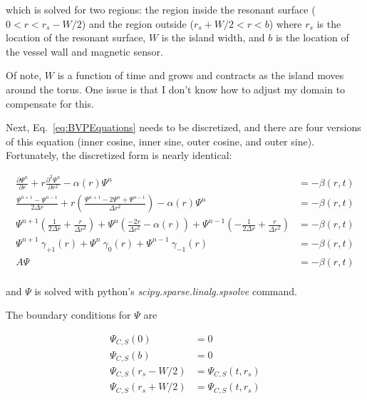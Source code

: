 \documentclass{article}
\begin{document}
\noindent which is solved for two regions: the region inside the resonant surface ($0<r<r_s-W/2$) and the region outside ($r_s+W/2<r<b$) where $r_s$ is the location of the resonant surface, $W$ is the island width, and $b$ is the location of the vessel wall and magnetic sensor.  

Of note, $W$ is a function of time and grows and contracts as the island moves around the torus.  One issue is that I don't know how to adjust my domain to compensate for this.  

Next, Eq.~\ref{eq:BVPEquations} needs to be discretized, and there are four versions of this equation (inner cosine, inner sine, outer cosine, and outer sine).  Fortunately, the discretized form is nearly identical:


\begin{equation} \label{eq:BVPSolved}
\begin{split}
 \frac{\partial \Psi^n}{\partial r} + r \frac{\partial^2 \Psi^n}{\partial r^2} -\alpha(r)  \Psi^n  & = - \beta(r,t) \\ 
 \frac{\Psi^{n+1}-\Psi^{n-1}}{2\Delta r}+r\left(\frac{\Psi^{n+1}-2\Psi^{n}+\Psi^{n-1}}{\Delta r^2}\right)-\alpha(r)\Psi^n & = - \beta(r,t)  \\
  \Psi^{n+1}\left(\frac{1}{2 \Delta r}+\frac{r}{\Delta r^2 }\right) + \Psi^n\left( \frac{-2r}{\Delta r^2} -\alpha(r) \right) + \Psi^{n-1}\left(-\frac{1}{2\Delta r} + \frac{r}{\Delta r^2} \right) & = - \beta(r,t) \\
  \Psi^{n+1} \ \gamma_{+1}(r) + \Psi^n \ \gamma_{0}(r) + \Psi^{n-1} \ \gamma_{-1}(r) & = - \beta(r,t) \\
A \Psi & = -\beta(r,t) \\
\end{split}
\end{equation}

\noindent and $\Psi$ is solved with python's \emph{scipy.sparse.linalg.spsolve} command.  

The boundary conditions for $\Psi$ are

\begin{equation} \label{eq:BVPAMatrix}
\begin{split}
\Psi_{C,S}(0)&=0 \\
\Psi_{C,S}(b)&=0 \\
\Psi_{C,S}(r_s-W/2)&=\Psi_{C,S}(t,r_s) \\
\Psi_{C,S}(r_s+W/2)&=\Psi_{C,S}(t,r_s) \\
\end{split}
\end{equation}
\end{document}

